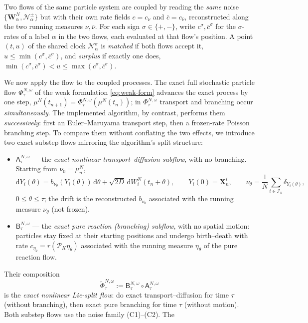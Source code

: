 \documentclass[a4paper,fleqn]{cas-sc}
\theoremstyle{definition}
\theoremstyle{remark}
\begin{document}
Two flows of the same particle system are coupled by reading the \emph{same} noise
$\{\mathbf W^N_\alpha,\mathcal N^\pm_\alpha\}$ but with their own rate fields $c=c_\nu$ and
$\bar c=c_{\bar\nu}$, reconstructed along the two running measures $\nu,\bar\nu$. For each
sign $\sigma\in\{+,-\}$, write $c^\sigma,\bar c^\sigma$ for the $\sigma$-rates of a label
$\alpha$ in the two flows, each evaluated at that flow's position. A point $(t,u)$ of the
shared clock $\mathcal N^\sigma_\alpha$ is \emph{matched} if both flows accept it,
$u\le\min(c^\sigma,\bar c^\sigma)$, and \emph{surplus} if exactly one does,
$\min(c^\sigma,\bar c^\sigma)<u\le\max(c^\sigma,\bar c^\sigma)$.

We now apply the flow to the coupled processes. The exact full stochastic
particle flow $\Phi^{N,\omega}_\tau$ of the weak formulation
\eqref{eq:weak-form} advances the exact process by one step,
$\mu^N(t_{n+1})=\Phi^{N,\omega}_\tau(\mu^N(t_n))$; in $\Phi^{N,\omega}_\tau$
transport and branching occur \emph{simultaneously}. The implemented algorithm,
by contrast, performs them \emph{successively}: first an Euler--Maruyama
transport step, then a frozen-rate Poisson branching step. To compare them
without conflating the two effects, we introduce two exact substep flows
mirroring the algorithm's split structure:
\begin{itemize}
\item $\mathsf A^{N,\omega}_\tau$ --- the \emph{exact nonlinear transport--diffusion
subflow}, with no branching. Starting from $\nu_0=\mu^N_n$,
\[
\mathrm dY_i(\theta)=b_{\nu_\theta}(Y_i(\theta))\,\mathrm d\theta
+\sqrt{2D}\,\mathrm dW^N_i(t_n+\theta),
\qquad Y_i(0)=\mathbf X^i_n,
\qquad
\nu_\theta=\frac1N\sum_{i\in\mathcal I_n}\delta_{Y_i(\theta)},
\]
$0\le\theta\le\tau$; the drift is the reconstructed $b_{\nu_\theta}$ associated
with the running measure $\nu_\theta$ (not frozen).
\item $\mathsf B^{N,\omega}_\tau$ --- the \emph{exact pure reaction (branching)
subflow}, with no spatial motion: particles stay fixed at their starting
positions and undergo birth--death with rate $c_{\eta_\theta}
=r(\mathcal P_K\eta_\theta)$ associated with the running measure
$\eta_\theta$ of the pure reaction flow.
\end{itemize}
Their composition
\[
\widetilde\Phi^{N,\omega}_\tau:=\mathsf B^{N,\omega}_\tau\circ\mathsf A^{N,\omega}_\tau
\]
is the \emph{exact nonlinear Lie-split flow}: do exact transport--diffusion for
time $\tau$ (without branching), then exact pure branching for time $\tau$
(without motion). Both substep flows use the noise family (C1)--(C2). The
\end{document}
